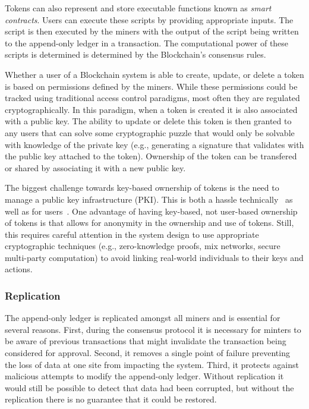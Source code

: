 Tokens can also represent and store executable functions known as \emph{smart contracts}.
Users can execute these scripts by providing appropriate inputs.
The script is then executed by the miners with the output of the script being written to the append-only ledger in a transaction.
The computational power of these scripts is determined is determined by the Blockchain's consensus rules.

Whether a user of a Blockchain system is able to create, update, or delete a token is based on permissions defined by the miners.
While these permissions could be tracked using traditional access control paradigms, most often they are regulated cryptographically.
In this paradigm, when a token is created it is also associated with a public key.
The ability to update or delete this token is then granted to any users that can solve some cryptographic puzzle that would only be solvable with knowledge of the private key (e.g., generating a signature that validates with the public key attached to the token).
Ownership of the token can be transfered or shared by associating it with a new public key.

The biggest challenge towards key-based ownership of tokens is the need to manage a public key infrastructure (PKI).
This is both a hassle technically~\cite{CT} as well as for users~\cite{ruoti2015johnny,barber2012bitter}.
One advantage of having key-based, not user-based ownership of tokens is that allows for anonymity in the ownership and use of tokens.
Still, this requires careful attention in the system design to use appropriate cryptographic techniques (e.g., zero-knowledge proofs, mix networks, secure multi-party computation) to avoid linking real-world individuals to their keys and actions.

\subsubsection{Replication}
The append-only ledger is replicated amongst all miners and is essential for several reasons.
First, during the consensus protocol it is necessary for minters to be aware of previous transactions that might invalidate the transaction being considered for approval.
Second, it removes a single point of failure preventing the loss of data at one site from impacting the system.
Third, it protects against malicious attempts to modify the append-only ledger. Without replication it would still be possible to detect that data had been corrupted, but without the replication there is no guarantee that it could be restored.

